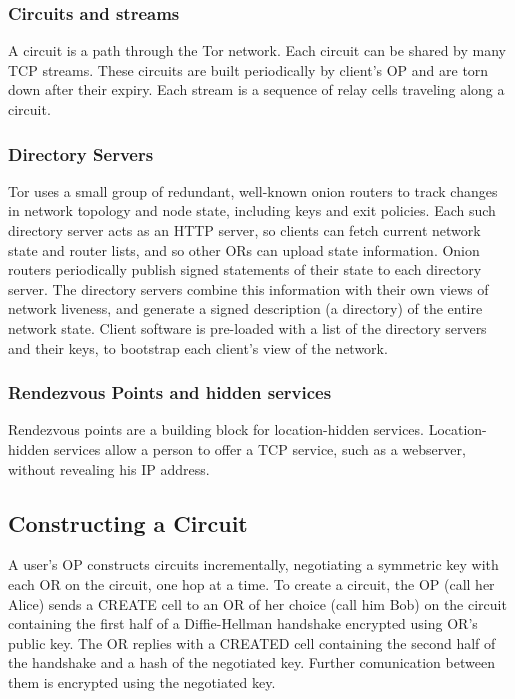 \documentclass{main}
\begin{document}
\subsubsection{Circuits and streams}  
A circuit is a path through the Tor network.
Each circuit can be shared by many TCP streams.
These circuits are built periodically by client's OP and are torn down after their expiry.
Each stream is a sequence of relay cells traveling along a circuit.

\subsubsection{Directory Servers}

Tor uses a small group of redundant, well-known onion
routers to track changes in network topology and node state,
including keys and exit policies. Each such directory server
acts as an HTTP server, so clients can fetch current network
state and router lists, and so other ORs can upload state information. Onion routers periodically publish signed statements
of their state to each directory server. The directory servers
combine this information with their own views of network
liveness, and generate a signed description (a directory) of
the entire network state. Client software is pre-loaded with a
list of the directory servers and their keys, to bootstrap each
client's view of the network.

\subsubsection{Rendezvous Points and hidden services}
Rendezvous points are a building block for location-hidden
services. Location-hidden services allow a person to offer a TCP service, such as a webserver, without revealing his IP address.

\subsection{Constructing a Circuit}

A user's OP constructs circuits incrementally, negotiating a symmetric key with each OR on the circuit, one hop at a time.
To create a circuit, the OP (call her Alice) sends a CREATE cell to an OR of her choice (call him Bob) on the circuit containing the first half of a Diffie-Hellman handshake encrypted using OR's public key.
The OR replies with a CREATED cell containing the second half of the handshake and a hash of the negotiated key.
Further comunication between them is encrypted using the negotiated key.
\end{document}
